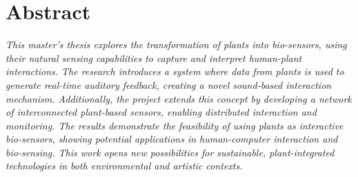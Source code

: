 \vspace*{\fill}

\section*{Abstract}
\textit{This master's thesis explores the transformation of plants into bio-sensors, using their natural sensing capabilities to capture and interpret human-plant interactions. The research introduces a system where data from plants is used to generate real-time auditory feedback, creating a novel sound-based interaction mechanism. Additionally, the project extends this concept by developing a network of interconnected plant-based sensors, enabling distributed interaction and monitoring. The results demonstrate the feasibility of using plants as interactive bio-sensors, showing potential applications in human-computer interaction and bio-sensing. This work opens new possibilities for sustainable, plant-integrated technologies in both environmental and artistic contexts.}
\vspace*{\fill}
